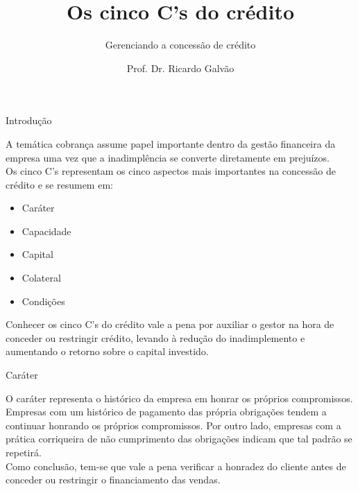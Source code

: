 \documentclass[10pt]{beamer}
\title{Os cinco C's do crédito}
\subtitle{Gerenciando a concessão de crédito}
\date{}
\author{Prof. Dr. Ricardo Galvão}
\institute{www.rgalvao.com}
\begin{document}
\maketitle




\begin{frame}[fragile]{Introdução}

A temática cobrança assume papel importante dentro da gestão financeira da empresa uma vez que a inadimplência se converte diretamente em prejuízos.\\
Os cinco C's representam os cinco aspectos mais importantes na concessão de crédito e se resumem em: 
\begin{itemize}
  \item Caráter
  \item Capacidade
  \item Capital
  \item Colateral
  \item Condições 
\end{itemize}
Conhecer os cinco C's do crédito vale a pena por auxiliar o gestor na hora de conceder ou restringir crédito, levando à redução do inadimplemento e aumentando o retorno sobre o capital investido.

\end{frame}


\begin{frame}[fragile]{Caráter}

O caráter representa o histórico da empresa em honrar os próprios compromissos.\\
Empresas com um histórico de pagamento das própria obrigações tendem a continuar honrando os próprios compromissos. Por outro lado, empresas com a prática corriqueira de não cumprimento das obrigações indicam que tal padrão se repetirá.\\
Como conclusão, tem-se que vale a pena verificar a honradez do cliente antes de conceder ou restringir o financiamento das vendas.

\end{frame}
\end{document}
